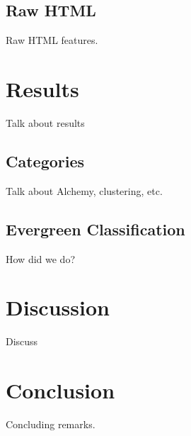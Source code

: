 \documentclass[11pt]{article}
\begin{document}
\subsection{Raw HTML}
\label{ssect:rawhtml}
Raw HTML features.


\section{Results}
\label{sect:results}
Talk about results


\subsection{Categories}
\label{sect:categories}
Talk about Alchemy, clustering, etc.


\subsection{Evergreen Classification}
\label{sect:evergreenclassification}
How did we do?


\section{Discussion}
\label{sect:discussion}
Discuss

\section{Conclusion}
\label{sect:conclusion}
Concluding remarks.





%
{}

%
%
\end{document}
